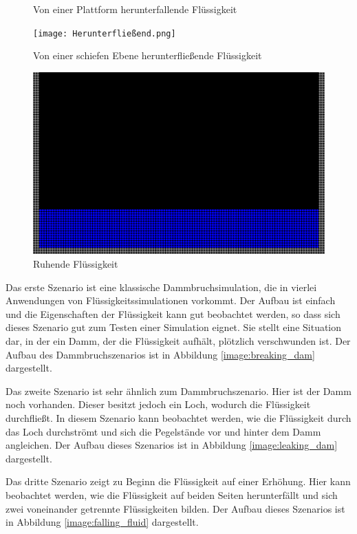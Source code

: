\documentclass[11pt,
a4paper,
parskip=half, %
BCOR=10mm, %
english,
ngerman]{scrreprt}
\begin{document}
\begin{figure}[htb]
\begin{minipage}[t]{0.45\textwidth}
        \caption{Von einer Plattform herunterfallende Flüssigkeit}
        \label{image:falling_fluid}
    \end{minipage}
    \begin{minipage}[t]{0.45\textwidth}
        \texttt{[image: Herunterfließend.png]}
        \caption{Von einer schiefen Ebene herunterfließende Flüssigkeit}
        \label{image:flowing_fluid}
    \end{minipage}
    \begin{minipage}[t]{0.45\textwidth}
        \includegraphics[width=\textwidth]{Ruhend.png}
        \caption{Ruhende Flüssigkeit}
        \label{image:resting_fluid}
    \end{minipage}
\end{figure}

Das erste Szenario ist eine klassische Dammbruchsimulation, die in vierlei Anwendungen von Flüssigkeitssimulationen vorkommt.
Der Aufbau ist einfach und die Eigenschaften der Flüssigkeit kann gut beobachtet werden, so dass sich dieses Szenario gut zum Testen einer Simulation eignet.
Sie stellt eine Situation dar, in der ein Damm, der die Flüssigkeit aufhält, plötzlich verschwunden ist.
Der Aufbau des Dammbruchszenarios ist in Abbildung \ref{image:breaking_dam} dargestellt.

Das zweite Szenario ist sehr ähnlich zum Dammbruchszenario. Hier ist der Damm noch vorhanden. Dieser besitzt jedoch ein Loch, wodurch die Flüssigkeit durchfließt.
In diesem Szenario kann beobachtet werden, wie die Flüssigkeit durch das Loch durchströmt und sich die Pegelstände vor und hinter dem Damm angleichen.
Der Aufbau dieses Szenarios ist in Abbildung \ref{image:leaking_dam} dargestellt.

Das dritte Szenario zeigt zu Beginn die Flüssigkeit auf einer Erhöhung.
Hier kann beobachtet werden, wie die Flüssigkeit auf beiden Seiten herunterfällt und sich zwei voneinander getrennte Flüssigkeiten bilden.
Der Aufbau dieses Szenarios ist in Abbildung \ref{image:falling_fluid} dargestellt.
\end{document}

